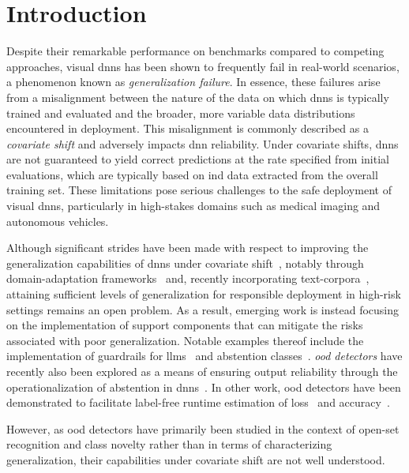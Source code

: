 \documentclass[10pt,twocolumn,letterpaper]{article}
\begin{document}
\section{Introduction}\label{sec:intro}
Despite their remarkable performance on benchmarks compared to competing approaches, visual \glspl{dnn} has been shown to frequently fail in real-world scenarios, a phenomenon known as \textit{generalization failure}\cite{shortcut_learning, skin_shortcut, shortcut_learning, damour2020underspecification, endocv2021_review, large-scale-ml-deployment, polyp_ai_use_reduces_adr}. In essence, these failures arise from a misalignment between the nature of the data on which \glspl{dnn} is typically trained and evaluated and the broader, more variable data distributions encountered in deployment. This misalignment is commonly described as a \textit{covariate shift} and adversely impacts \gls{dnn} reliability. Under covariate shifts, \glspl{dnn} are not guaranteed to yield correct predictions at the rate specified from initial evaluations, which are typically based on \gls{ind} data extracted from the overall training set. These limitations pose serious challenges to the safe deployment of visual \glspl{dnn}, particularly in high-stakes domains such as medical imaging and autonomous vehicles.

Although significant strides have been made with respect to improving the generalization capabilities of \glspl{dnn} under covariate shift~\cite{oodg_survey}, notably through domain-adaptation frameworks~\cite{domain_adaptation, domain_adaptation_2} and, recently incorporating text-corpora~\cite{clip_generalization}, attaining sufficient levels of generalization for responsible deployment in high-risk settings remains an open problem. As a result, emerging work is instead focusing on the implementation of support components that can mitigate the risks associated with poor generalization. Notable examples thereof include the implementation of guardrails for \glspl{llm}~\cite{llm_monitoring_i1, llm_monitoring_io2} and abstention classes~\cite{abstention, llm_hallucination_prevention}. \textit{\Gls{ood} detectors} have recently also been explored as a means of ensuring output reliability through the operationalization of abstention in \glspl{dnn}~\cite{enase_rv, ood_position}. In other work, \gls{ood} detectors have been demonstrated to facilitate label-free runtime estimation of loss~\cite{rv_lossregression} and accuracy~\cite{acm_pra,garg2022leveraging}. 

However, as \Gls{ood} detectors have primarily been studied in the context of open-set recognition and class novelty rather than in terms of characterizing generalization, their capabilities under covariate shift are not well understood. 
\end{document}
